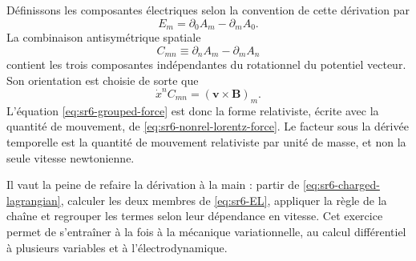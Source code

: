 Définissons les composantes électriques selon la convention de cette dérivation par
\begin{equation}
E_m=\partial_0A_m-\partial_mA_0.
\label{eq:sr6-electric-from-potential}
\end{equation}
La combinaison antisymétrique spatiale
\begin{equation}
C_{mn}
\equiv
\partial_nA_m-\partial_mA_n
\label{eq:sr6-spatial-curl-tensor}
\end{equation}
contient les trois composantes indépendantes du rotationnel du potentiel vecteur. Son orientation est choisie de sorte que
\begin{equation}
\dot x^nC_{mn}
=
\left(\mathbf v\times\mathbf B\right)_m.
\end{equation}
L’équation \eqref{eq:sr6-grouped-force} est donc la forme relativiste, écrite avec la quantité de mouvement, de \eqref{eq:sr6-nonrel-lorentz-force}. Le facteur sous la dérivée temporelle est la quantité de mouvement relativiste par unité de masse, et non la seule vitesse newtonienne.

Il vaut la peine de refaire la dérivation à la main : partir de \eqref{eq:sr6-charged-lagrangian}, calculer les deux membres de \eqref{eq:sr6-EL}, appliquer la règle de la chaîne et regrouper les termes selon leur dépendance en vitesse. Cet exercice permet de s’entraîner à la fois à la mécanique variationnelle, au calcul différentiel à plusieurs variables et à l’électrodynamique.

\begin{classroomqa}\end{classroomqa}

\begin{classroomqa}\end{classroomqa}


